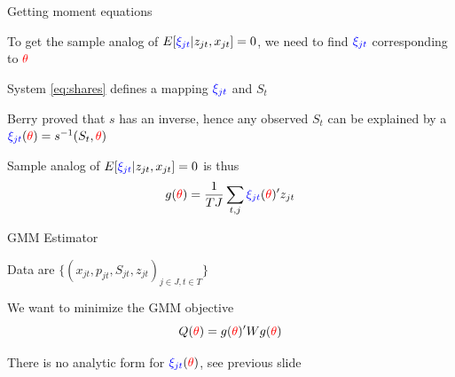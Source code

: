 \documentclass[english]{beamer}
\begin{document}
\begin{frame}{Getting moment equations}
\begin{midi}
\item To get the sample analog of $E[{\color{blue}{\xi_{jt}}}|z_{jt},x_{jt}] = 0$, we need to find ${\color{blue}{\xi_{jt}}}$ corresponding to ${\color{red}{\theta}}$
\item System \eqref{eq:shares} defines a mapping ${\color{blue}{\xi_{jt}}}$ and $S_t$
\item Berry proved that $s$ has an inverse, hence any observed $S_t$ can be explained by a  ${\color{blue}{\xi_{jt}}}({\color{red}{\theta}}) = s^{-1}(S_t,{\color{red}{\theta}})$
\item Sample analog of $E[{\color{blue}{\xi_{jt}}}|z_{jt},x_{jt}] = 0$ is thus
\begin{equation*}
g({\color{red}{\theta}}) = \frac{1}{TJ}\sum_{t,j} {\color{blue}{\xi_{jt}}}({\color{red}{\theta}})' z_{jt}
\end{equation*}
\end{midi}
\end{frame}

\begin{frame}{GMM Estimator}
\begin{widei}
\item Data are $\{(x_{jt},p_{jt},S_{jt},z_{jt})_{j\in J,t\in T}\}$
\item We want to minimize the GMM objective
\begin{equation*}
Q({\color{red}{\theta}}) = g({\color{red}{\theta}})' W g({\color{red}{\theta}})
\end{equation*}
\item There is no analytic form for ${\color{blue}{\xi_{jt}}}({\color{red}{\theta}})$, see previous slide
\end{widei}
\end{frame}
\end{document}
